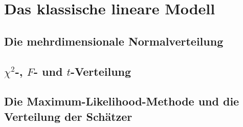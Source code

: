 \section{Das klassische lineare Modell}

\subsection{Die mehrdimensionale Normalverteilung}

\subsection{$\chi^2$-, $F$- und $t$-Verteilung}

\subsection{Die Maximum-Likelihood-Methode und die Verteilung der Schätzer}
